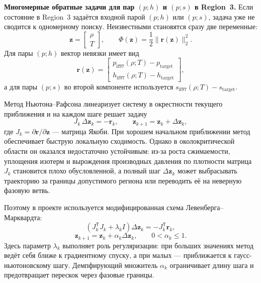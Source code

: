 \noindent\textbf{Многомерные обратные задачи для пар $(p; h)$ и $(p; s)$ в Region~3.}
Если состояние в Region~3 задаётся входной парой $(p; h)$
или $(p; s)$,
задача уже не сводится к одномерному поиску.
Неизвестными становятся сразу две переменные:
\begin{equation}
\mathbf{z} =
\left[
\begin{array}{c}
\rho \\
T
\end{array}
\right],
\qquad
\Phi(\mathbf{z}) = \frac{1}{2}\|\mathbf{r}(\mathbf{z})\|_{2}^{2}.
\end{equation}
Для пары $(p; h)$ вектор невязки имеет вид
\begin{equation}
\mathbf{r}(\mathbf{z}) =
\left[
\begin{array}{c}
p_{\mathrm{if97}}(\rho; T) - p_{\mathrm{target}} \\
h_{\mathrm{if97}}(\rho; T) - h_{\mathrm{target}}
\end{array}
\right],
\end{equation}
а для пары $(p; s)$
во второй компоненте используется
$s_{\mathrm{if97}}(\rho; T) - s_{\mathrm{target}}$.

Метод Ньютона--Рафсона
линеаризует систему в окрестности текущего приближения
и на каждом шаге решает задачу
\begin{equation}
J_{k}\,\Delta \mathbf{z}_{k} = -\mathbf{r}_{k},
\qquad
\mathbf{z}_{k+1} = \mathbf{z}_{k} + \Delta \mathbf{z}_{k},
\end{equation}
где $J_{k} = \partial \mathbf{r}/\partial \mathbf{z}$
--- матрица Якоби.
При хорошем начальном приближении
метод обеспечивает быструю локальную сходимость.
Однако в околокритической области
он оказался недостаточно устойчивым:
из-за роста сжимаемости,
уплощения изотерм и вырождения производных давления по плотности
матрица $J_{k}$ становится плохо обусловленной,
а полный шаг $\Delta \mathbf{z}_{k}$
может выбрасывать траекторию за границы допустимого региона
или переводить её на неверную фазовую ветвь.

Поэтому в проекте используется
модифицированная схема Левенберга--Марквардта:
\begin{equation}
\left(J_{k}^{\mathsf{T}}J_{k} + \lambda_{k} I\right)\Delta \mathbf{z}_{k}
= -J_{k}^{\mathsf{T}}\mathbf{r}_{k},
\end{equation}
\begin{equation}
\mathbf{z}_{k+1} = \mathbf{z}_{k} + \alpha_{k}\Delta \mathbf{z}_{k},
\qquad
0 < \alpha_{k} \le 1.
\end{equation}
Здесь параметр $\lambda_{k}$ выполняет роль регуляризации:
при больших значениях метод ведёт себя ближе к градиентному спуску,
а при малых --- приближается к гаусс-ньютоновскому шагу.
Демпфирующий множитель $\alpha_{k}$
ограничивает длину шага
и предотвращает перескок через фазовые границы.

